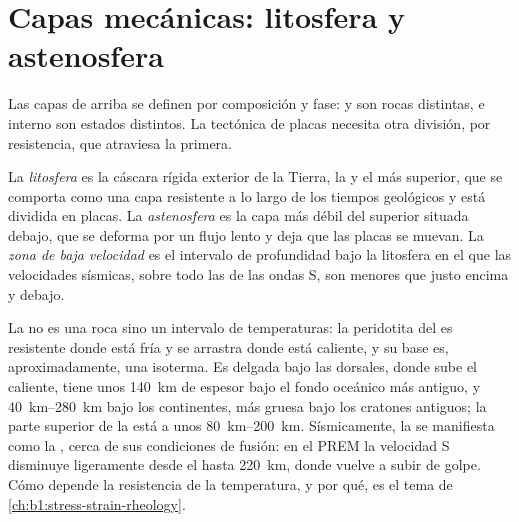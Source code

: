\section{Capas mecánicas: litosfera y astenosfera}

Las capas de arriba se definen por composición y fase:  y  son rocas distintas,  e interno son estados
distintos. La tectónica de placas necesita otra división, por resistencia, que atraviesa la primera.

\begin{definition}
\label{def:b1:layered-earth:lithosphere}
La \emph{litosfera} es la cáscara rígida exterior de la Tierra, la  y el  más superior, que se
comporta como una capa resistente a lo largo de los tiempos geológicos y está dividida en placas. La
\emph{astenosfera} es la capa más débil del  superior situada debajo, que se deforma por un flujo lento y
deja que las placas se muevan. La \emph{zona de baja velocidad} es el intervalo de profundidad
bajo la litosfera en el que las velocidades sísmicas, sobre todo las de las ondas S, son menores que justo encima y debajo.
\end{definition}

La  no es una roca sino un intervalo de temperaturas: la peridotita del  es resistente donde está fría y se
arrastra donde está caliente, y su base es, aproximadamente, una isoterma. Es delgada bajo las dorsales, donde sube el 
caliente, tiene unos \qty{140}{km} de espesor bajo el fondo oceánico más antiguo, y \qtyrange{40}{280}{km} bajo los continentes,
más gruesa bajo los cratones antiguos; la parte superior de la  está a unos \qtyrange{80}{200}{km}. Sísmicamente, la
 se manifiesta como la , cerca de sus condiciones de fusión: en el PREM la velocidad S disminuye
ligeramente desde el  hasta \qty{220}{km}, donde vuelve a subir de golpe. Cómo depende la resistencia de la temperatura, y
por qué, es el tema de \cref{ch:b1:stress-strain-rheology}.

